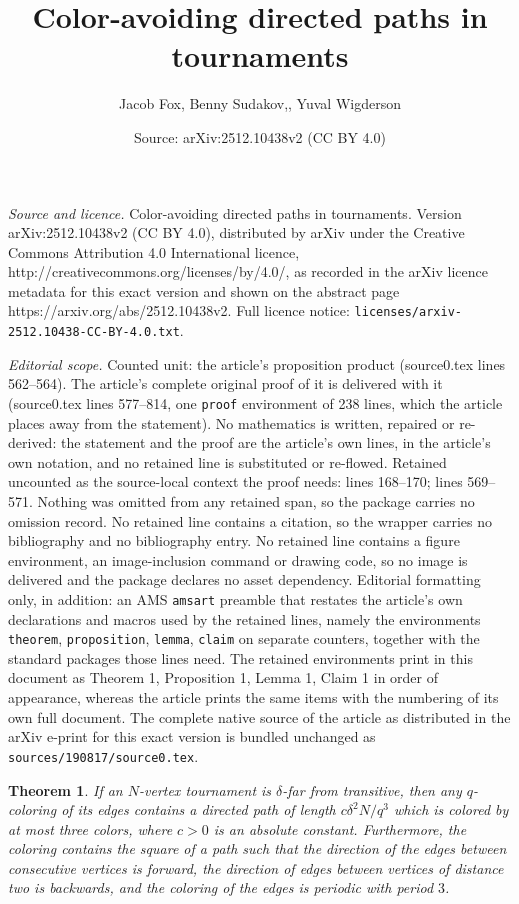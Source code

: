 \documentclass[10pt,a4paper]{amsart}
\title{Color-avoiding directed paths in tournaments}
\author{Jacob Fox, Benny Sudakov,, Yuval Wigderson}
\date{Source: arXiv:2512.10438v2 (CC BY 4.0)}
\newtheorem{theorem}{Theorem}
\begin{document}
\maketitle

\noindent\emph{Source and licence.} Color-avoiding directed paths in tournaments. Version arXiv:2512.10438v2 (CC BY 4.0), distributed by arXiv under the Creative Commons Attribution 4.0 International licence, http://creativecommons.org/licenses/by/4.0/, as recorded in the arXiv licence metadata for this exact version and shown on the abstract page https://arxiv.org/abs/2512.10438v2. Full licence notice: \texttt{licenses/arxiv-2512.10438-CC-BY-4.0.txt}.\par\smallskip

\noindent\textit{Editorial scope.} Counted unit: the article's proposition product (source0.tex lines 562--564). The article's complete original proof of it is delivered with it (source0.tex lines 577--814, one \texttt{proof} environment of 238 lines, which the article places away from the statement). No mathematics is written, repaired or re-derived: the statement and the proof are the article's own lines, in the article's own notation, and no retained line is substituted or re-flowed.  Retained uncounted as the source-local context the proof needs: lines 168--170; lines 569--571.  Nothing was omitted from any retained span, so the package carries no omission record.  No retained line contains a citation, so the wrapper carries no bibliography and no bibliography entry.  No retained line contains a figure environment, an image-inclusion command or drawing code, so no image is delivered and the package declares no asset dependency.  Editorial formatting only, in addition: an AMS \texttt{amsart} preamble that restates the article's own declarations and macros used by the retained lines, namely the environments \texttt{theorem}, \texttt{proposition}, \texttt{lemma}, \texttt{claim} on separate counters, together with the standard packages those lines need.  The retained environments print in this document as Theorem 1, Proposition 1, Lemma 1, Claim 1 in order of appearance, whereas the article prints the same items with the numbering of its own full document.  The complete native source of the article as distributed in the arXiv e-print for this exact version is bundled unchanged as \texttt{sources/190817/source0.tex}.
\begin{theorem}\label{labelfarfromtransitive}
    If an $N$-vertex tournament is $\delta$-far from transitive, then any $q$-coloring of its edges contains a directed path of length $c\delta^2 N/q^3$ which is colored by at most three colors, where $c>0$ is an absolute constant. Furthermore, the coloring contains the square of a path such that the direction of the edges between consecutive vertices is forward, the direction of edges between vertices of distance two is backwards, and the coloring of the edges is periodic with period $3$. 
\end{theorem}
\end{document}
